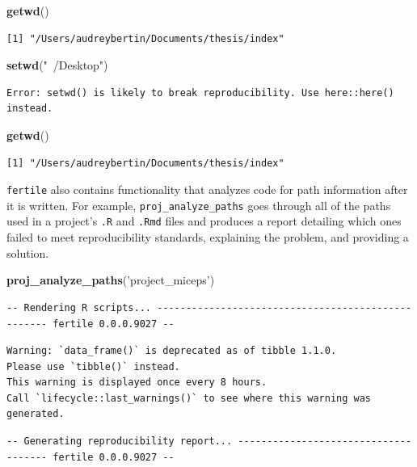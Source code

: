 \documentclass[12pt,twoside]{reedthesis}
\newenvironment{Shaded}{\begin{snugshade}}{\end{snugshade}}
\newcommand{\KeywordTok}[1]{\textcolor[rgb]{0.13,0.29,0.53}{\textbf{#1}}}
\newcommand{\StringTok}[1]{\textcolor[rgb]{0.31,0.60,0.02}{#1}}
\newcommand{\NormalTok}[1]{#1}
\begin{document}
\footnotesize
\begin{Shaded}
\begin{Highlighting}[]
\KeywordTok{getwd}\NormalTok{()}
\end{Highlighting}
\end{Shaded}
\begin{verbatim}
[1] "/Users/audreybertin/Documents/thesis/index"
\end{verbatim}
\begin{Shaded}
\begin{Highlighting}[]
\KeywordTok{setwd}\NormalTok{(}\StringTok{"~/Desktop"}\NormalTok{)}
\end{Highlighting}
\end{Shaded}
\begin{verbatim}
Error: setwd() is likely to break reproducibility. Use here::here() instead.
\end{verbatim}
\begin{Shaded}
\begin{Highlighting}[]
\KeywordTok{getwd}\NormalTok{()}
\end{Highlighting}
\end{Shaded}
\begin{verbatim}
[1] "/Users/audreybertin/Documents/thesis/index"
\end{verbatim}
\texttt{fertile} also contains functionality that analyzes code for path
information after it is written. For example,
\texttt{proj\_analyze\_paths} goes through all of the paths used in a
project's \texttt{.R} and \texttt{.Rmd} files and produces a report
detailing which ones failed to meet reproducibility standards,
explaining the problem, and providing a solution.
\begin{Shaded}
\begin{Highlighting}[]
\KeywordTok{proj_analyze_paths}\NormalTok{(}\StringTok{'project_miceps'}\NormalTok{)}
\end{Highlighting}
\end{Shaded}
\begin{verbatim}
-- Rendering R scripts... --------------------------------------------------- fertile 0.0.0.9027 --
\end{verbatim}
\begin{verbatim}
Warning: `data_frame()` is deprecated as of tibble 1.1.0.
Please use `tibble()` instead.
This warning is displayed once every 8 hours.
Call `lifecycle::last_warnings()` to see where this warning was generated.
\end{verbatim}
\begin{verbatim}
-- Generating reproducibility report... ------------------------------------- fertile 0.0.0.9027 --
\end{verbatim}
\end{document}
